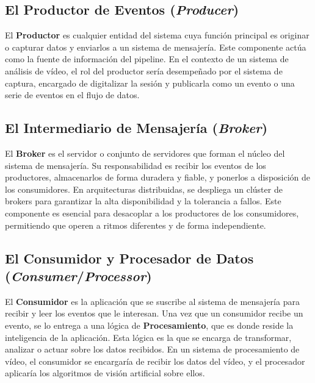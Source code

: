 \subsection{El Productor de Eventos (\textit{Producer})}
El \textbf{Productor} es cualquier entidad del sistema cuya función principal es originar o capturar datos y enviarlos a un sistema de mensajería. Este componente actúa como la fuente de información del pipeline. En el contexto de un sistema de análisis de vídeo, el rol del productor sería desempeñado por el sistema de captura, encargado de digitalizar la sesión y publicarla como un evento o una serie de eventos en el flujo de datos.

\subsection{El Intermediario de Mensajería (\textit{Broker})}
El \textbf{Broker} es el servidor o conjunto de servidores que forman el núcleo del sistema de mensajería. Su responsabilidad es recibir los eventos de los productores, almacenarlos de forma duradera y fiable, y ponerlos a disposición de los consumidores. En arquitecturas distribuidas, se despliega un clúster de brokers para garantizar la alta disponibilidad y la tolerancia a fallos. Este componente es esencial para desacoplar a los productores de los consumidores, permitiendo que operen a ritmos diferentes y de forma independiente.

\subsection{El Consumidor y Procesador de Datos (\textit{Consumer}/\textit{Processor})}
El \textbf{Consumidor} es la aplicación que se suscribe al sistema de mensajería para recibir y leer los eventos que le interesan. Una vez que un consumidor recibe un evento, se lo entrega a una lógica de \textbf{Procesamiento}, que es donde reside la inteligencia de la aplicación. Esta lógica es la que se encarga de transformar, analizar o actuar sobre los datos recibidos. En un sistema de procesamiento de vídeo, el consumidor se encargaría de recibir los datos del vídeo, y el procesador aplicaría los algoritmos de visión artificial sobre ellos.

